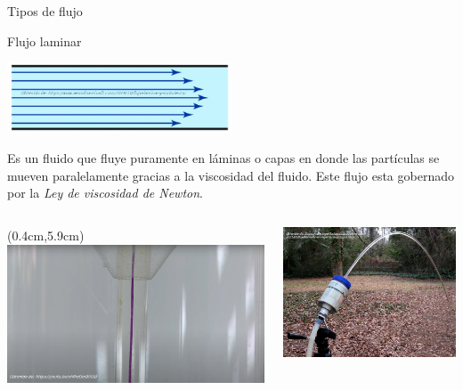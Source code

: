 \documentclass [xcolor=svgnames, t] {beamer}
\begin{document}
\begin{frame}{Tipos de flujo}
\vspace{-0.3cm}
\begin{block}{Flujo laminar}
\begin{center}
\includegraphics[width=0.5\textwidth]{flami}
\end{center}
Es un fluido que fluye puramente en l\'aminas o capas en donde las part\'iculas se mueven paralelamente gracias a la viscosidad del fluido. Este flujo esta gobernado por la \emph{Ley de viscosidad de Newton}.
\end{block}
\begin{columns}
\begin{textblock*}{6cm}(0.4cm,5.9cm) %
\includegraphics[width=\textwidth]{flami2}
\end{textblock*}
\includegraphics[width=\textwidth]{flami3}
\end{columns}
\end{frame}
\end{document}
